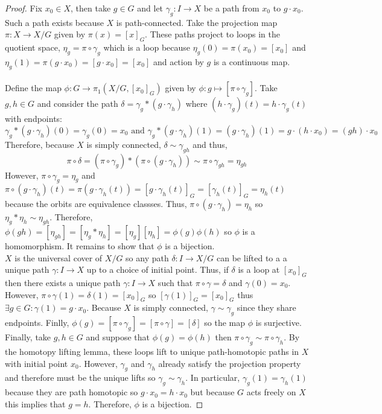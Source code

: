 \documentclass[12pt]{extarticle}
\begin{document}
\begin{proof}
Fix $x_0 \in X$, then take $g \in G$ and let $\gamma_g : I \to X$ be a path from $x_0$ to $g \cdot x_0$. Such a path exists because $X$ is path-connected. Take the projection map $\pi : X \to X/G$ given by $\pi(x) = [x]_G$. These paths project to loops in the quotient space, $\eta_g = \pi \circ \gamma_g$ which is a loop because $\eta_g(0) = \pi(x_0) = [x_0]$ and $\eta_g(1) = \pi(g \cdot x_0) = [g \cdot x_0] = [x_0]$ and action by $g$ is a continuous map. \\\\
Define the map $\phi : G \to \pi_1(X/G, [x_0]_G)$ given by $\phi : g \mapsto [\pi \circ \gamma_g]$. Take $g, h \in G$ and consider the path $\delta = \gamma_g * (g \cdot \gamma_h)$  where $(h \cdot \gamma_g)(t) = h \cdot \gamma_g(t)$ with endpoints:
\[\gamma_g * (g \cdot \gamma_h)(0) = \gamma_g(0) = x_0 \text{ and } \gamma_g * (g \cdot \gamma_h)(1) = (g \cdot \gamma_h)(1) = g \cdot (h \cdot x_0) = (gh) \cdot x_0\]
Therefore, because $X$ is simply connected, $\delta \sim \gamma_{gh}$ and thus, 
\[\pi \circ \delta = (\pi \circ \gamma_g) * (\pi \circ (g \cdot \gamma_h)) \sim \pi \circ \gamma_{gh} = \eta_{gh}\]
However, $\pi \circ \gamma_g = \eta_g$ and $\pi \circ (g \cdot \gamma_h)(t) = \pi(g \cdot \gamma_h(t)) = [g \cdot \gamma_h(t)]_G = [\gamma_h(t)]_G = \eta_h(t)$ because the orbits are equivalence classses. Thus, $\pi \circ (g \cdot \gamma_h) = \eta_h$ so $\eta_g * \eta_h \sim \eta_{gh}$. 
Therefore, $\phi(gh) = [\eta_{gh}] = [\eta_g * \eta_h] = [\eta_g] [\eta_h] = \phi(g) \phi(h)$ so $\phi$ is a homomorphism. It remains to show that $\phi$ is a bijection. \bigskip \\
$X$ is the universal cover of $X/G$ so any path $\delta : I \to X/G$ can be lifted to a a unique path $\gamma : I \to X$ up to a choice of initial point. Thus, if $\delta$ is a loop at $[x_0]_G$ then there exists a unique path $\gamma : I \to X$ such that $\pi \circ \gamma = \delta$ and $\gamma(0) = x_0$. However, $\pi \circ \gamma(1) = \delta(1) = [x_0]_G$ so $[\gamma(1)]_G = [x_0]_G$ thus $\exists g \in G : \gamma(1) = g \cdot x_0$. Because $X$ is simply connected, $\gamma \sim \gamma_g$ since they share endpoints. Finlly, $\phi(g) = [\pi \circ \gamma_g] = [\pi \circ \gamma] = [\delta]$ so the map $\phi$ is surjective. Finally, take $g, h \in G$ and suppose that $\phi(g) = \phi(h)$ then $\pi \circ \gamma_g \sim \pi \circ \gamma_h$. By the homotopy lifting lemma, these loops lift to unique path-homotopic paths in $X$ with initial point $x_0$. However, $\gamma_g$ and $\gamma_h$ already satisfy the projection property and therefore must be the unique lifts so $\gamma_g \sim \gamma_h$. In particular, $\gamma_g(1) = \gamma_h(1)$ because they are path homotopic so $g \cdot x_0 = h \cdot x_0$ but because $G$ acts freely on $X$ this implies that $g = h$. Therefore, $\phi$ is a bijection.      
\end{proof}
\end{document}
